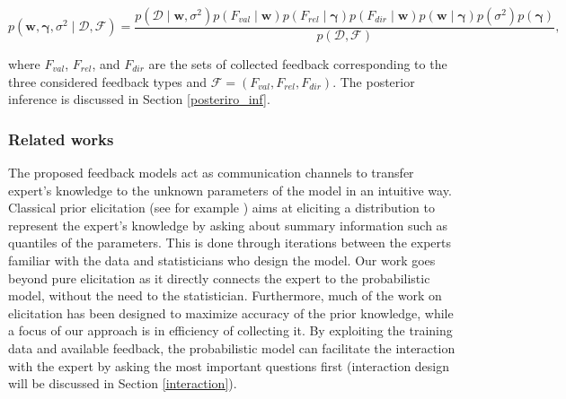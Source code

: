 \documentclass[dissertation,math,vertlayout,pdfa,colorlinks]{aaltoseries}
\newcommand{\bw}{\bm{w}}
\newcommand{\bD}{\mathcal{D}}
\newcommand{\bF}{\mathcal{F}}
\begin{document}
\begin{equation}\label{Eq:Bayes_rule_ss_reg_with_fb}
p(\bw, \bm{\gamma}, \sigma^2 \mid \bD,\bF) = \frac{p(\bD \mid \bw, \sigma^2)p(F_{val} \mid \bw)p(F_{rel} \mid \bm{\gamma})p(F_{dir} \mid \bw)p(\bw \mid \bm{\gamma})p(\sigma^2)p(\bm{\gamma})}{p(\bD,\bF)},
\end{equation} 

\noindent where $F_{val}$, $F_{rel}$, and $F_{dir}$ are the sets of collected feedback corresponding to the three considered feedback types and $\bF = (F_{val}, F_{rel}, F_{dir})$. The  posterior inference is discussed in Section \ref{posteriro_inf}.




\subsubsection{Related works}

The proposed feedback models act as communication channels to transfer expert's knowledge to the unknown parameters of the model in an intuitive way. Classical prior elicitation (see for example \cite{OHagan06,garthwaite2005statistical}) aims at eliciting a distribution to represent the expert's knowledge by asking about summary information such as quantiles of the parameters. This is done through iterations between the experts familiar with the data and statisticians who design the model. Our work goes beyond pure elicitation as it directly connects the expert to the probabilistic model, without the need to the statistician. Furthermore, much of the work on elicitation has been designed to maximize accuracy of the prior knowledge, while a focus of our approach is in efficiency of collecting it. By exploiting the training data and available feedback, the probabilistic model can facilitate the interaction with the expert by asking the most important questions first (interaction design will be discussed in Section \ref{interaction}).
\end{document}
